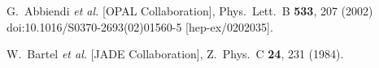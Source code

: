 \documentclass[a4paper,11pt,notoc]{article}
\begin{document}
\begin{thebibliography}{1}
	G.~Abbiendi {\it et al.} [OPAL Collaboration],
	Phys.\ Lett.\ B {\bf 533}, 207 (2002)
	doi:10.1016/S0370-2693(02)01560-5
	[hep-ex/0202035].
	
	
	W.~Bartel {\it et al.} [JADE Collaboration],
	Z.\ Phys.\ C {\bf 24}, 231 (1984).
	
\end{thebibliography}




\end{document}
